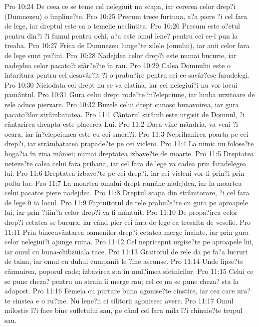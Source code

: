 Pro 10:24  De ceea ce se teme cel nelegiuit nu scapa, iar cererea celor drep?i (Dumnezeu) o împline?te.
Pro 10:25  Precum trece furtuna, a?a piere ?i cel fara de lege, iar dreptul este ca o temelie neclintita.
Pro 10:26  Precum este o?etul pentru din?i ?i fumul pentru ochi, a?a este omul lene? pentru cei ce-l pun la treaba.
Pro 10:27  Frica de Dumnezeu lunge?te zilele (omului), iar anii celor fara de lege sunt pu?ini.
Pro 10:28  Nadejdea celor drep?i este numai bucurie, iar nadejdea celor pacato?i sfâr?e?te în rau.
Pro 10:29  Calea Domnului este o întaritura pentru cel desavâr?it ?i o prabu?ire pentru cei ce savâr?esc faradelegi.
Pro 10:30  Niciodata cel drept nu se va clatina, iar cei nelegiui?i nu vor locui pamântul.
Pro 10:31  Gura celui drept rode?te în?elepciune, iar limba urzitoare de rele aduce pierzare.
Pro 10:32  Buzele celui drept cunosc bunavoirea, iar gura pacato?ilor strâmbatatea.
Pro 11:1  Cântarul strâmb este urgisit de Domnul, ?i cântarirea dreapta este placerea Lui.
Pro 11:2  Daca vine mândria, va veni ?i ocara, iar în?elepciunea este cu cei smeri?i.
Pro 11:3  Neprihanirea poarta pe cei drep?i, iar strâmbatatea prapade?te pe cei vicleni.
Pro 11:4  La nimic nu folose?te boga?ia în ziua mâniei; numai dreptatea izbave?te de moarte.
Pro 11:5  Dreptatea neteze?te calea celui fara prihana, iar cel fara de lege va cadea prin faradelegea lui.
Pro 11:6  Dreptatea izbave?te pe cei drep?i, iar cei vicleni vor fi prin?i prin pofta lor.
Pro 11:7  La moartea omului drept ramâne nadejdea, iar la moartea celui pacatos piere nadejdea.
Pro 11:8  Dreptul scapa din strâmtorare, ?i cel fara de lege îi ia locul.
Pro 11:9  Faptuitorul de rele prabu?e?te cu gura pe aproapele lui, iar prin ?tiin?a celor drep?i va fi mântuit.
Pro 11:10  De propa?irea celor drep?i cetatea se bucura, iar când pier cei fara de lege ea tresalta de veselie.
Pro 11:11  Prin binecuvântarea oamenilor drep?i cetatea merge înainte, iar prin gura celor nelegiui?i ajunge ruina.
Pro 11:12  Cel nepriceput urgise?te pe aproapele lui, iar omul cu buna-chibzuiala tace.
Pro 11:13  Graitorul de rele da pe fa?a lucruri de taina, iar omul cu duhul cumpanit le ?ine ascunse.
Pro 11:14  Unde lipse?te cârmuirea, poporul cade; izbavirea sta în mul?imea sfetnicilor.
Pro 11:15  Celui ce se pune cheza? pentru un strain îi merge rau; cel ce nu se pune cheza? sta la adapost.
Pro 11:16  Femeia cu purtare buna agonise?te cinstire, iar cea care ura?te cinstea e o ru?ine. Nu lene?ii ci silitorii agonisesc avere.
Pro 11:17  Omul milostiv î?i face bine sufletului sau, pe când cel fara mila î?i chinuie?te trupul sau.

